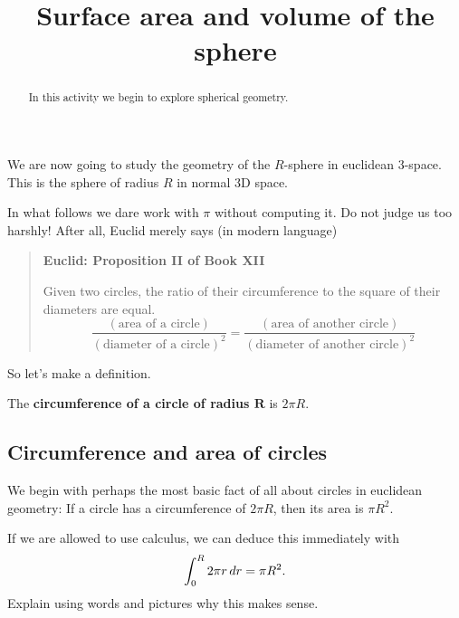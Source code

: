 \documentclass[hints,handout,noauthor,nooutcomes,12pt]{ximera}
\title{Surface area and volume of the sphere}
\begin{document}
\begin{abstract}
In this activity we begin to explore spherical geometry.
\end{abstract}
\maketitle


We are now going to study the geometry of the $R$-sphere in euclidean
$3$-space. This is the sphere of radius $R$ in normal $3$D space.



In what follows we dare work with $\pi$ without computing it. Do not
judge us too harshly! After all, Euclid merely says (in modern language)
\begin{quote}
  \textbf{Euclid: Proposition II of Book XII}
  
  Given two circles, the ratio of their circumference to the square of
  their diameters are equal.
  \[
  \frac{(\text{area of a circle})}{(\text{diameter of a circle})^2} =
  \frac{(\text{area of another circle})}{(\text{diameter of another
      circle})^2}
  \]
\end{quote}

So let's make a definition.

\begin{definition}
  The \textbf{circumference of a circle of radius $\boldsymbol R$} is $2\pi R$.
\end{definition}

\subsection{Circumference and area of circles}

We begin with perhaps the most basic fact of all about circles in
euclidean geometry: If a circle has a circumference of $2\pi R$, then
its area is $\pi R^2$.

\begin{problem}
  If we are allowed to use calculus, we can deduce this immediately with
  \[
  \int_0^R 2\pi r \,d r = \pi R^2.
  \]
  Explain using words and pictures why this makes sense.
\end{problem}
\end{document}
